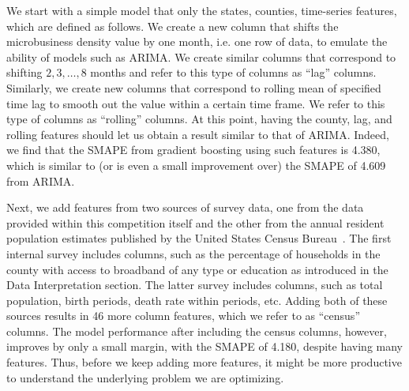 \documentclass[prl,aps,superscriptaddress,twocolumn,10pt,nolongbibliography]{revtex4-2}
\begin{document}
We start with a simple model that only the states, counties, time-series features, which are defined as follows.
We create a new column that shifts the microbusiness density value by one month, i.e. one row of data, to emulate the ability of models such as ARIMA.
We create similar columns that correspond to shifting $2, 3, \ldots, 8$ months and refer to this type of columns as ``lag'' columns.
Similarly, we create new columns that correspond to rolling mean of specified time lag to smooth out the value within a certain time frame.
We refer to this type of columns as ``rolling'' columns.
At this point, having the county, lag, and rolling features should let us obtain a result similar to that of ARIMA. 
Indeed, we find that the SMAPE from gradient boosting using such features is 4.380, which is similar to (or is even a small improvement over) the SMAPE of 4.609 from ARIMA.

Next, we add features from two sources of survey data, one from the data provided within this competition itself and the other from the annual resident population estimates published by the United States Census Bureau~\cite{uscensus}.
The first internal survey includes columns, such as the percentage of households in the county with access to broadband of any type or education as introduced in the Data Interpretation section.
The latter survey includes columns, such as total population, birth periods, death rate within periods, etc. 
Adding both of these sources results in 46 more column features, which we refer to as ``census'' columns.
The model performance after including the census columns, however, improves by only a small margin, with the SMAPE of 4.180, despite having many features. 
Thus, before we keep adding more features, it might be more productive to understand the underlying problem we are optimizing. 
\end{document}
